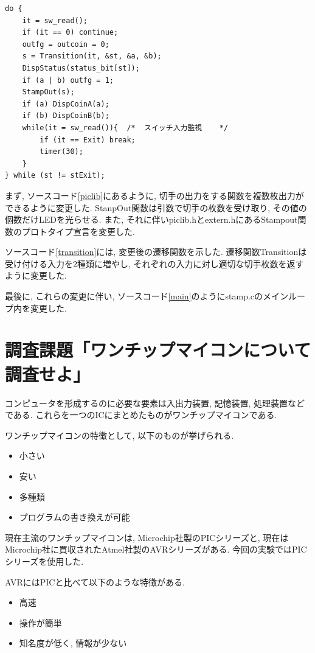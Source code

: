 \documentclass[titlepage]{jsarticle}
\begin{document}
        \begin{lstlisting}[caption=stamp.c メインループ, label=main]
do {
    it = sw_read();
    if (it == 0) continue;
    outfg = outcoin = 0;
    s = Transition(it, &st, &a, &b);
    DispStatus(status_bit[st]);
    if (a | b) outfg = 1;
    StampOut(s);
    if (a) DispCoinA(a);
    if (b) DispCoinB(b);
    while(it = sw_read()){	/*  スイッチ入力監視	*/
        if (it == Exit) break;
        timer(30);
    }
} while (st != stExit);
        \end{lstlisting}

        まず, ソースコード\ref{piclib}にあるように, 切手の出力をする関数を複数枚出力ができるように変更した.
        StanpOut関数は引数で切手の枚数を受け取り, その値の個数だけLEDを光らせる.
        また, それに伴いpiclib.hとextern.hにあるStampout関数のプロトタイプ宣言を変更した.

        ソースコード\ref{transition}には, 変更後の遷移関数を示した.
        遷移関数Transitionは受け付ける入力を2種類に増やし,
        それぞれの入力に対し適切な切手枚数を返すように変更した.

        最後に, これらの変更に伴い, ソースコード\ref{main}のようにstamp.cのメインループ内を変更した.
    
\section{調査課題「ワンチップマイコンについて調査せよ」}
    コンピュータを形成するのに必要な要素は入出力装置, 記憶装置, 処理装置などである.
    これらを一つのICにまとめたものがワンチップマイコンである.

    ワンチップマイコンの特徴として, 以下のものが挙げられる.

    \begin{itemize}
        \item 小さい
        \item 安い
        \item 多種類
        \item プログラムの書き換えが可能
    \end{itemize}

    現在主流のワンチップマイコンは, Microchip社製のPICシリーズと,
    現在はMicrochip社に買収されたAtmel社製のAVRシリーズがある.
    今回の実験ではPICシリーズを使用した.

    AVRにはPICと比べて以下のような特徴がある.

    \begin{itemize}
        \item 高速
        \item 操作が簡単
        \item 知名度が低く, 情報が少ない
    \end{itemize}
\end{document}
